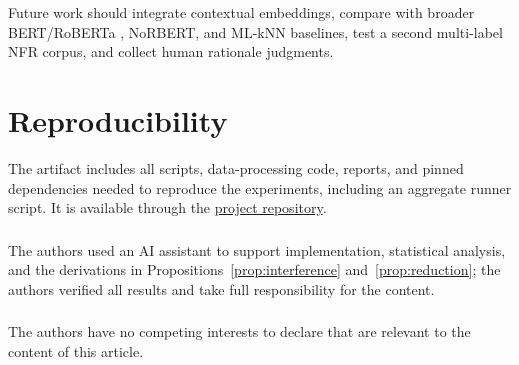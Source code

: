 \documentclass[runningheads]{llncs}
\begin{document}
Future work should integrate contextual embeddings, compare with broader
BERT/RoBERTa \cite{liu2019roberta}, NoRBERT, and ML-kNN
\cite{zhang2007mlknn} baselines, test a second multi-label NFR corpus, and
collect human rationale judgments.

\section*{Reproducibility}
The artifact includes all scripts, data-processing code, reports, and pinned
dependencies needed to reproduce the experiments, including an aggregate
runner script. It is available through the
\href{https://github.com/Lancelot-sys25/Quantum-Inspired-NFR-Classification}{project repository}.

\begin{credits}
\subsubsection{\ackname}
The authors used an AI assistant to support implementation, statistical
analysis, and the derivations in Propositions~\ref{prop:interference}
and~\ref{prop:reduction}; the authors verified all results and take full
responsibility for the content.

\subsubsection{\discintname}
The authors have no competing interests to declare that are relevant to the
content of this article.
\end{credits}



\end{document}
